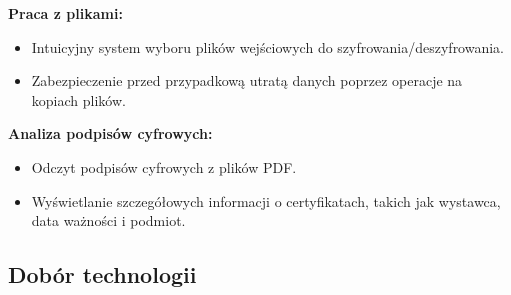 \documentclass[12pt,a4paper]{article}
\begin{document}
\textbf{Praca z plikami:}
\begin{itemize}
\item Intuicyjny system wyboru plików wejściowych do szyfrowania/deszyfrowania.
\item Zabezpieczenie przed przypadkową utratą danych poprzez operacje na kopiach plików.
\end{itemize}

\textbf{Analiza podpisów cyfrowych:}
\begin{itemize}
\item Odczyt podpisów cyfrowych z plików PDF.
\item Wyświetlanie szczegółowych informacji o certyfikatach, takich jak wystawca, data ważności i podmiot.
\end{itemize}



\newpage
\subsection{Dobór technologii}
\end{document}
